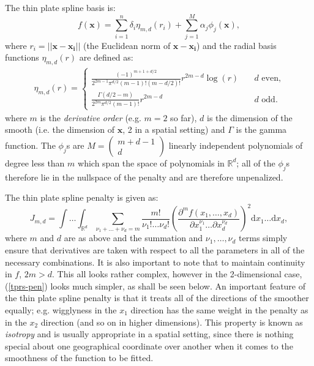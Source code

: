 The thin plate spline basis is:
\begin{equation}
f(\mathbf{x}) = \sum_{i=1}^n \delta_i \eta_{m,d}(r_i) + \sum_{j=1}^M \alpha_j \phi_j(\mathbf{x}),
\label{tprs-basis} 
\end{equation}
where $r_i=\lvert \lvert \mathbf{x}-\mathbf{x_i}\rvert \rvert$ (the Euclidean norm of $ \mathbf{x}-\mathbf{x_i}$) and the radial basis functions $\eta_{m,d}(r)$ are defined as:
\begin{align*}
\eta_{m,d}(r) =\begin{cases} \frac{(-1)^{m+1+d/2}}{2^{2m-1}\pi^{d/2}(m-1)!(m-d/2)!} r^{2m-d} \log(r) &\quad{\text{$d$ even,}}\\
\frac{\Gamma(d/2-m)}{2^{2m}\pi^{d/2}(m-1)!} r^{2m-d} &\quad{\text{$d$ odd.}}
\end{cases}
\end{align*}
where $m$ is the \textit{derivative order} (e.g. $m=2$ so far), $d$ is the dimension of the smooth (i.e. the dimension of $\mathbf{x}$, 2 in a spatial setting) and $\Gamma$ is the gamma function. The $\phi_j$s are $M=\left( \begin{smallmatrix} m+d-1 \\ d  \end{smallmatrix}\right)$ linearly independent polynomials of degree less than $m$ which span the space of polynomials in $\mathbb{R}^d$; all of the $\phi_j$s therefore lie in the nullspace of the penalty and are therefore unpenalized.

The thin plate spline penalty is given as:
\begin{equation}
J_{m,d} = \int \ldots \int_{\mathbb{R}^d} \sum_{\nu_1 + \dots + \nu_d=m} \frac{m!}{\nu_1! \dots \nu_d!} \left ( \frac{\partial^m f(x_1,\dots,x_d)}{\partial x_1^{\nu_1} \ldots  \partial x_d^{\nu_d}} \right )^2 \text{d} x_1 \ldots  \text{d} x_d,
\label{tprs-pen}
\end{equation}
where $m$ and $d$ are as above and the summation and $\nu_1,\ldots,\nu_d$ terms simply ensure that derivatives are taken with respect to all the parameters in all of the necessary combinations. It is also important to note that to maintain continuity in $f$, $2m>d$. This all looks rather complex, however in the 2-dimensional case, (\ref{tprs-pen}) looks much simpler, as shall be seen below. An important feature of the thin plate spline penalty is that it treats all of the directions of the smoother equally; e.g. wigglyness in the $x_1$ direction has the same weight in the penalty as in the $x_2$ direction (and so on in higher dimensions). This property is known as \textit{isotropy} and is usually appropriate in a spatial setting, since there is nothing special about one geographical coordinate over another when it comes to the smoothness of the function to be fitted.


